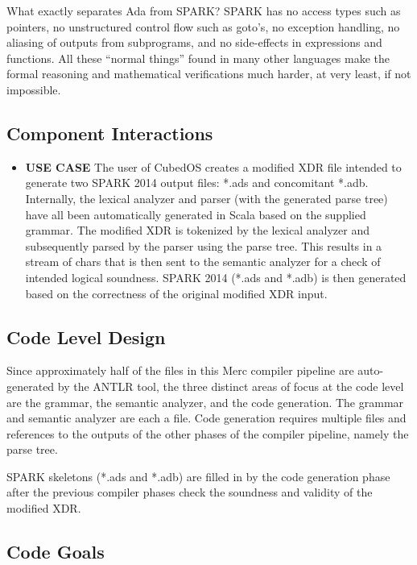 \begin{itemize}
  What exactly separates Ada from SPARK? SPARK has no access types such as pointers, no
  unstructured control flow such as goto’s, no exception handling, no aliasing of outputs from
  subprograms, and no side-effects in expressions and functions. All these “normal things” found
  in many other languages make the formal reasoning and mathematical verifications much harder,
  at very least, if not impossible.
\end{itemize}

\subsection{Component Interactions}

\begin{itemize}
\item \textbf{USE CASE} The user of CubedOS creates a modified XDR file intended to generate two
  SPARK 2014 output files: *.ads and concomitant *.adb. Internally, the lexical analyzer and
  parser (with the generated parse tree) have all been automatically generated in Scala based on
  the supplied grammar. The modified XDR is tokenized by the lexical analyzer and subsequently
  parsed by the parser using the parse tree. This results in a stream of chars that is then sent
  to the semantic analyzer for a check of intended logical soundness. SPARK 2014 (*.ads and
  *.adb) is then generated based on the correctness of the original modified XDR input.
\end{itemize}

\subsection{Code Level Design}

Since approximately half of the files in this Merc compiler pipeline are auto-generated by
the ANTLR tool, the three distinct areas of focus at the code level are the grammar, the
semantic analyzer, and the code generation. The grammar and semantic analyzer are each a file.
Code generation requires multiple files and references to the outputs of the other phases of the
compiler pipeline, namely the parse tree.

SPARK skeletons (*.ads and *.adb) are filled in by the code generation phase after the previous
compiler phases check the soundness and validity of the modified XDR.

\subsection{Code Goals}

